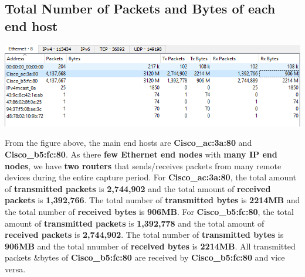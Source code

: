 \documentclass[a4paper,11pt]{article}
\begin{document}
\subsection{Total Number of Packets and Bytes of each end host}
	\begin{minipage}{5in}
	\centering
		\includegraphics[width = 16cm]{endhost}
		\captionsetup{justification=centering}
	\end{minipage}
\newline\newline
From the figure above, the main end hosts are \textbf{Cisco\_ac:3a:80} and \textbf{Cisco\_b5:fc:80}. As  there \textbf{few Ethernet end nodes}  with \textbf{many IP end nodes}, we have \textbf{two routers} that sends/receives packets from many remote devices during the entire capture period. For \textbf{Cisco\_ac:3a:80}, the total amount of \textbf{transmitted packets} is \textbf{2,744,902} and the total amount of \textbf{received packets} is \textbf{1,392,766}. The total number of \textbf{transmitted bytes} is \textbf{2214MB} and the total number of \textbf{received bytes} is \textbf{906MB}. \newline
For \textbf{Cisco\_b5:fc:80}, the total amount of \textbf{transmitted packets} is \textbf{1,392,778} and the total amount of \textbf{received packets} is \textbf{2,744,902}. The total number of \textbf{transmitted bytes} is \textbf{906MB} and the total nnumber of \textbf{received bytes} is \textbf{2214MB}. \newline
All transmitted packets \&bytes of \textbf{Cisco\_b5:fc:80} are received by \textbf{Cisco\_b5:fc:80} and vice versa.
\end{document}

